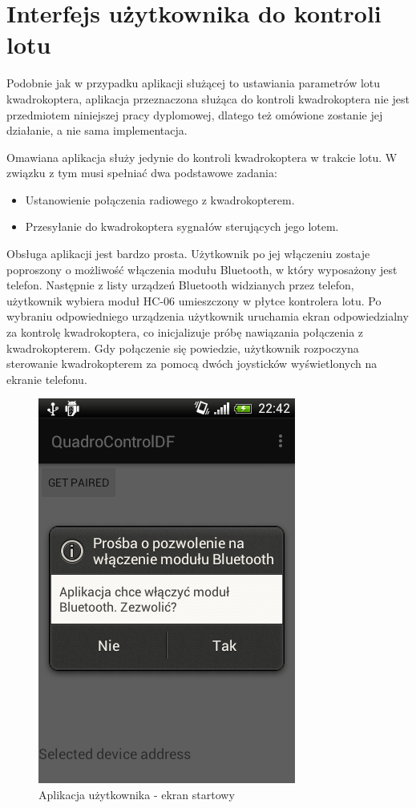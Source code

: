 \section{Interfejs użytkownika do kontroli lotu}

Podobnie jak w przypadku aplikacji służącej to ustawiania parametrów lotu kwadrokoptera, aplikacja przeznaczona służąca do kontroli kwadrokoptera nie jest przedmiotem niniejszej pracy dyplomowej, dlatego też omówione zostanie jej działanie, a nie sama implementacja.

Omawiana aplikacja służy jedynie do kontroli kwadrokoptera w trakcie lotu. W związku z tym musi spełniać dwa podstawowe zadania:
\begin{itemize}
	\item Ustanowienie połączenia radiowego z kwadrokopterem.
	\item Przesyłanie do kwadrokoptera sygnałów sterujących jego lotem.
\end{itemize}

Obsługa aplikacji jest bardzo prosta. Użytkownik po jej włączeniu zostaje poproszony o możliwość włączenia modułu Bluetooth, w który wyposażony jest telefon. Następnie z listy urządzeń Bluetooth widzianych przez telefon, użytkownik wybiera moduł HC-06 umieszczony w płytce kontrolera lotu. Po wybraniu odpowiedniego urządzenia użytkownik uruchamia ekran odpowiedzialny za kontrolę kwadrokoptera, co inicjalizuje próbę nawiązania połączenia z kwadrokopterem. Gdy połączenie się powiedzie, użytkownik rozpoczyna sterowanie kwadrokopterem za pomocą dwóch joysticków wyświetlonych na ekranie telefonu.

\begin{figure}[H]
	\centering
	\includegraphics[scale=0.6]{Pictures/DroidAtScreen/droid@screen-1.png}
	\caption[Aplikacja użytkownika - ekran startory]{Aplikacja użytkownika - ekran startowy}
	\label{fig:QuadroControl_screen1}
\end{figure}

